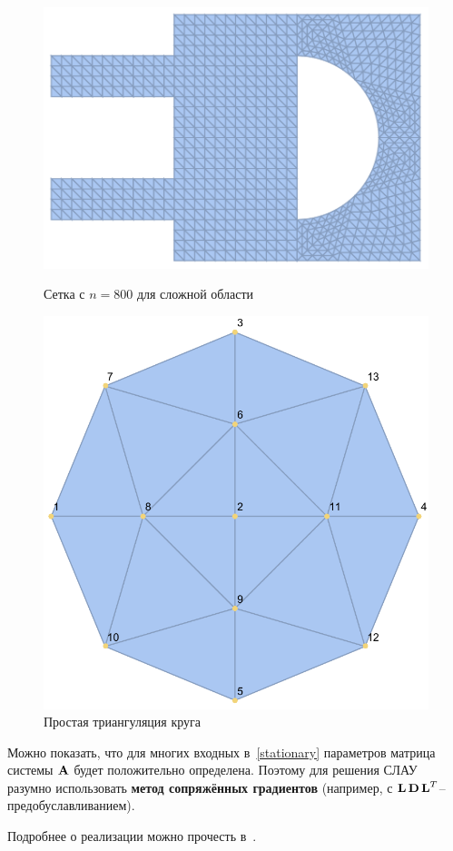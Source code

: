 \begin{figure}[!hb]
	\includegraphics[width=\linewidth]{img/matrixPlotStripsMesh.pdf}
	\caption{Сетка с $n = 800$ для сложной области}\label{fig:matrixPlotStripsMesh}
	\endminipage\hfill
	\includegraphics[width=\linewidth]{img/typicalMesh.pdf}
	\caption{Простая триангуляция круга}\label{fig:matrixPlotCircleMesh}
	\endminipage
\end{figure}

Можно показать, что для многих входных в~\ref{stationary} параметров матрица системы $\boldsymbol{\mathbf{A}}$ будет положительно определена. Поэтому для решения СЛАУ разумно использовать \textbf{метод сопряжённых градиентов} (например, с $\boldsymbol{\mathbf{L}} \, \boldsymbol{\mathbf{D}} \, \boldsymbol{\mathbf{L}}^T$--предобуславливанием).

Подробнее о реализации можно прочесть в~\cite{saad}.






